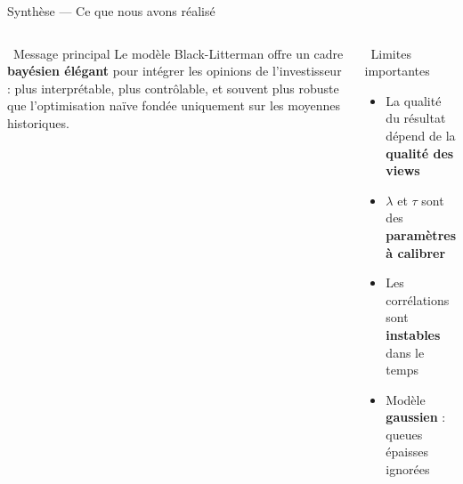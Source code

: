 \documentclass[aspectratio=169, 10pt, t]{beamer}
\newcommand{\warn}[1]{\textcolor{WarnOrange}{\faExclamationTriangle\ #1}}
\begin{document}
\begin{frame}{Synthèse — Ce que nous avons réalisé}
  \vspace{0.8em}
  \begin{columns}[c]
      \begin{block}{\faQuoteLeft\ Message principal}
        \small
        Le modèle Black-Litterman offre un cadre \textbf{bayésien élégant}
        pour intégrer les opinions de l'investisseur : plus interprétable,
        plus contrôlable, et souvent plus robuste que l'optimisation
        naïve fondée uniquement sur les moyennes historiques.
      \end{block}
      \begin{alertblock}{\small\warn{Limites importantes}}
        \small
        \begin{itemize}
          \setlength{\itemsep}{2pt}
          \item La qualité du résultat dépend de la \textbf{qualité des views}
          \item $\lambda$ et $\tau$ sont des \textbf{paramètres à calibrer}
          \item Les corrélations sont \textbf{instables} dans le temps
          \item Modèle \textbf{gaussien} : queues épaisses ignorées
        \end{itemize}
      \end{alertblock}
  \end{columns}
\end{frame}
\end{document}
